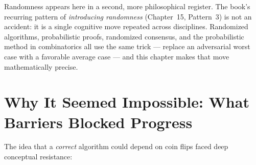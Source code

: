 Randomness appears here in a second, more philosophical register. The book's recurring pattern of \emph{introducing randomness} (Chapter~15, Pattern~3) is not an accident: it is a single cognitive move repeated across disciplines. Randomized algorithms, probabilistic proofs, randomized consensus, and the probabilistic method in combinatorics all use the same trick --- replace an adversarial worst case with a favorable average case --- and this chapter makes that move mathematically precise.

\section{Why It Seemed Impossible: What Barriers Blocked Progress}
\label{sec:randomized:impossible}

The idea that a \emph{correct} algorithm could depend on coin flips faced deep conceptual resistance:

